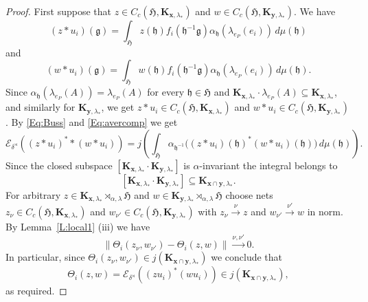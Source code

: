 \documentclass[10pt,a4paper]{amsart}
\newcommand{\E}{{\mathcal{E}}}
\def\al{\alpha}
\newcommand{\bo}[1]{\mathbf{#1}} %
\def\de{\delta}
\newcommand{\fH}{{\mathfrak{H}}}
\newcommand{\fg}{{\mathfrak{g}}}
\newcommand{\fh}{{\mathfrak{h}}}
\def\la{\lambda}
\begin{document}
\begin{proof}
First suppose that $z\in C_c(\fH,\bo{K}_{\bo{x},\la_\ast})$ and
$w\in C_c(\fH,\bo{K}_{\bo{y},\la_\ast})$. We have
\[
(z \ast u_i)(\fg)=\int_{\fH}z(\fh) f_i(\fh^{-1}\fg) \al_{\fh}(\la_{e_P}(e_i))\,d\mu(\fh)
\]
and
\[
(w \ast u_i)(\fg)=\int_{\fH}w(\fh)f_i(\fh^{-1}\fg) \al_{\fh}(\la_{e_P}(e_i))\,d\mu(\fh).
\]
Since $\al_{\fh}(\la_{e_P}(A))=\la_{e_P}(A)$ for every $\fh\in \fH$ and $\bo{K}_{\bo{x},\la_\ast} \cdot \la_{e_P}(A) \subseteq \bo{K}_{\bo{x},\la_\ast}$, and similarly for $\bo{K}_{\bo{y},\la_\ast}$, we get $z \ast u_i\in C_c(\fH,\bo{K}_{\bo{x},\la_\ast})$ and $w \ast u_i\in C_c(\fH,\bo{K}_{\bo{y},\la_\ast})$.
By \eqref{Eq:Buss} and \eqref{Eq:avercomp} we get
\[
\E_{\de^{\rtimes}}((z \ast u_i)^* \ast (w\ast u_i))
=
j\left(\int_{\fH}\al_{\fh^{-1}}
\big((z \ast u_i)(\fh)^*(w \ast u_i)(\fh)\big)\,d\mu(\fh)\right).
\]
Since the closed subspace $[\bo{K}_{\bo{x},\la_\ast} \cdot \bo{K}_{\bo{y},\la_\ast} ]$ is $\al$-invariant the integral belongs to
\[
[\bo{K}_{\bo{x},\la_\ast} \cdot \bo{K}_{\bo{y},\la_\ast} ] \subseteq \bo{K}_{\bo{x}\cap \bo{y},\la_\ast}.
\]
For arbitrary
$z\in \bo{K}_{\bo{x},\la_\ast} \rtimes_{\al,\la}\fH$ and
$w\in \bo{K}_{\bo{y},\la_\ast} \rtimes_{\al,\la}\fH$ choose nets
$z_\nu\in C_c(\fH,\bo{K}_{\bo{x},\la_\ast})$ and $w_{\nu'}\in C_c(\fH,\bo{K}_{\bo{y},\la_\ast})$ with $z_\nu \xrightarrow{\nu}z$ and $w_{\nu'} \xrightarrow{\nu'} w$ in norm. By Lemma~\ref{L:local1} (iii) we have
\[
\|\Theta_i(z_\nu,w_{\nu'})-\Theta_i(z,w)\|
\xrightarrow{\nu,\nu'} 0.
\]
In particular, since $\Theta_i(z_\nu,w_{\nu'})\in j(\bo{K}_{\bo{x}\cap \bo{y},\la_\ast})$ we conclude that
\[
\Theta_i(z,w)=\E_{\de^{\rtimes}}((z u_i)^*(w u_i))\in j(\bo{K}_{\bo{x}\cap \bo{y},\la_\ast}),
\]
as required.
\end{proof}
\end{document}

